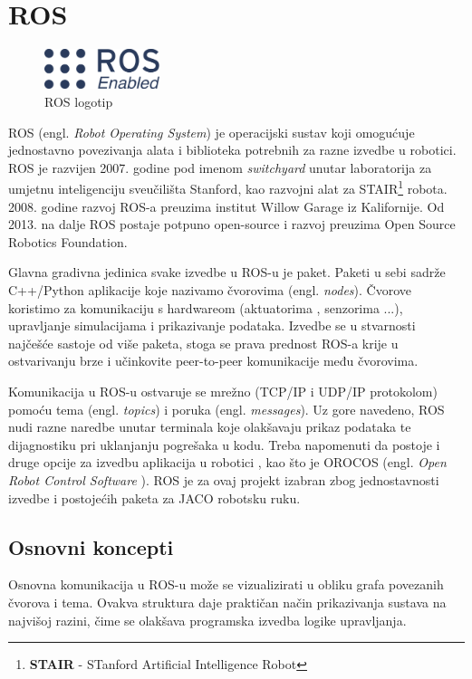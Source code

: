 \documentclass[times, utf8, diplomski, numeric]{fer}
\begin{document}
\section{ROS}
\begin{figure}[h!]
\centering
\includegraphics[width = 0.3\textwidth]{ros_enabled}
\caption{ROS logotip}
\end{figure}
ROS (engl. \textit{Robot Operating System}) je operacijski sustav koji omogućuje jednostavno povezivanja alata i biblioteka potrebnih za razne izvedbe u robotici. 
ROS je razvijen 2007. godine pod imenom \textit{switchyard} unutar laboratorija za umjetnu inteligenciju sveučilišta Stanford, kao razvojni alat za STAIR\footnote{\textbf{STAIR} - STanford Artificial Intelligence Robot} robota.
2008. godine razvoj ROS-a preuzima institut Willow Garage iz Kalifornije. 
Od 2013. na dalje ROS postaje potpuno open-source i razvoj preuzima Open Source Robotics Foundation.

Glavna gradivna jedinica svake izvedbe u ROS-u je paket.
Paketi u sebi sadrže C++/Python aplikacije koje nazivamo čvorovima (engl. \textit{nodes}).
Čvorove koristimo za komunikaciju s hardwareom (aktuatorima , senzorima ...), upravljanje simulacijama i prikazivanje podataka.
Izvedbe se u stvarnosti najčešće sastoje od više paketa, stoga se prava prednost ROS-a krije u ostvarivanju brze i učinkovite peer-to-peer komunikacije među čvorovima.
 
Komunikacija u ROS-u ostvaruje se mrežno (TCP/IP i UDP/IP protokolom) pomoću tema (engl. \textit{topics}) i poruka (engl. \textit{messages}).
Uz gore navedeno, ROS nudi razne naredbe unutar terminala koje olakšavaju prikaz podataka te dijagnostiku pri uklanjanju pogrešaka u kodu. Treba napomenuti da postoje i druge opcije za izvedbu aplikacija u robotici , kao što je OROCOS (engl. \textit{Open Robot Control Software} ). ROS je za ovaj projekt izabran zbog jednostavnosti izvedbe i postojećih paketa za JACO robotsku ruku.
\subsection{Osnovni koncepti}
Osnovna komunikacija u ROS-u može se vizualizirati u obliku grafa povezanih čvorova i tema. Ovakva struktura daje praktičan način prikazivanja sustava na najvišoj razini, čime se olakšava programska izvedba logike upravljanja. 
\end{document}
